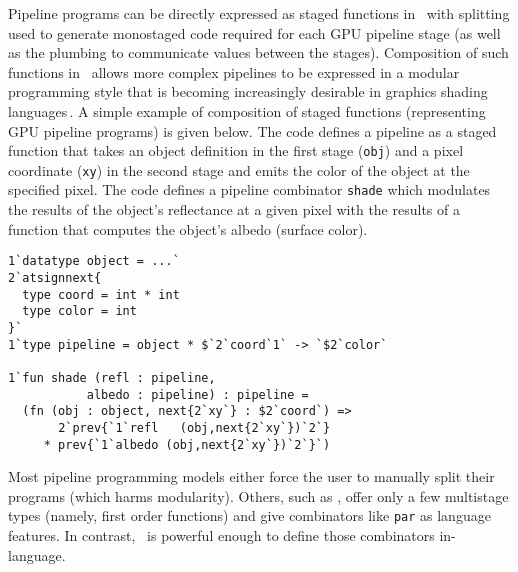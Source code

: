 Pipeline programs can be directly expressed as staged functions in \lang\, with splitting 
used to generate monostaged code required for each GPU pipeline stage
(as well as the plumbing to communicate values between the stages).
Composition of such functions in \lang\ allows more complex pipelines to be expressed in a modular programming style
that is becoming increasingly desirable in graphics shading languages\,\cite{Foley:2011,He:2014}. A simple example of composition of staged functions (representing GPU pipeline programs) is given below.  The code defines a pipeline as a staged function that takes an object definition in the first stage (\texttt{obj}) and a pixel coordinate (\texttt{xy}) in the second stage and emits the color of the object at the specified pixel. The code defines a pipeline combinator \texttt{shade} which modulates the results of the object's reflectance at a given pixel with the results of a function that computes the object's albedo (surface color).  
%
\begin{lstlisting} 
1`datatype object = ...`
2`atsignnext{
  type coord = int * int
  type color = int
}`
1`type pipeline = object * $`2`coord`1` -> `$2`color`

1`fun shade (refl : pipeline,
           albedo : pipeline) : pipeline =
  (fn (obj : object, next{2`xy`} : $2`coord`) =>
       2`prev{`1`refl   (obj,next{2`xy`})`2`}
     * prev{`1`albedo (obj,next{2`xy`})`2`}`)
\end{lstlisting}
%
Most pipeline programming models either force the user to manually split their programs (which harms modularity).
Others, such as \cite{Foley:2011}, offer only a few multistage types (namely, first order functions) and give 
combinators like \texttt{par} as language features.
In contrast, \lang\ is powerful enough to define those combinators in-language.

